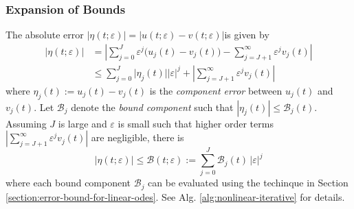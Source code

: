 \documentclass[accepted]{uai2023}
\newcommand{\Err}{\eta}
\newcommand{\Bound}{\mathcal{B}}
\begin{document}
\subsubsection{Expansion of Bounds}\label{section:expansion-of-bounds}
    The absolute error $|\Err(t;\varepsilon)| = |u(t;\varepsilon) - v(t;\varepsilon)|$is given by 
    {
        \small
        \begin{align}
            |\Err(t; \varepsilon)| %
            &= \left|\sum_{j=0}^{J} \varepsilon^{j} \Big(u_j(t) - v_j(t)\Big) - \sum_{j=J+1}^{\infty} \varepsilon^j v_j(t)\right| \nonumber \\[-0.5em]
            &\leq \sum_{j=0}^{J} \Big|\Err_{j}(t)\Big||\varepsilon|^j + \left|\sum_{j=J+1}^{\infty}\varepsilon^j v_j(t)\right| 
        \end{align}
    }
    where $\Err_{j}(t) := u_j(t) - v_j(t)$ is the \textit{component error} between $u_j(t)$ and $v_j(t)$.
    Let $\Bound_{j}$ denote the \textit{bound component} such that $|\Err_{j}(t)| \leq \Bound_j(t)$.
    Assuming $J$ is large and $\varepsilon$ is small such that higher order terms $\left|\sum_{j=J+1}^{\infty}\varepsilon^j v_j(t)\right|$ are negligible, there is 
    {
        \small
        \begin{equation} \label{eq:nonlinear-bound-components}
            \Big|\Err(t; \varepsilon)\Big| \leq \Bound(t; \varepsilon) := \sum_{j=0}^{J} \Bound_j(t)\,|\varepsilon|^j 
        \end{equation}
    }
    where each bound component $\Bound_j$ can be evaluated using the techinque in Section \ref{section:error-bound-for-linear-odes}. 
    See Alg. \ref{alg:nonlinear-iterative} for details.
\end{document}
